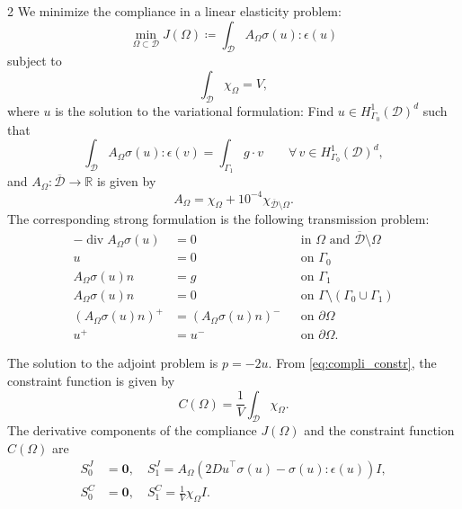\documentclass[a4paper, oneside]{article}
\begin{document}
\begin{multicols}{2}
We minimize the compliance in a linear elasticity problem:
\begin{equation} \label{eq:compli_cost}
	\min_{\Omega \subset \mathcal{D}}
	J(\Omega) \coloneqq \int_{\mathcal{D}} A_{\Omega}\sigma(u):\epsilon(u)
\end{equation}
subject to
\begin{equation}\label{eq:compli_constr}
	\int_{\mathcal{D}} \chi_{\Omega} = V,
\end{equation}
where $u$ is the solution to the variational formulation:
Find $u \in  H^1_{\Gamma_0}(\mathcal{D})^d$ such that
\begin{equation}\label{eq:compli_weak}
\int_{\mathcal{D}} A_{\Omega}\sigma(u):\epsilon(v) = \int_{\Gamma_1} g \cdot v
\qquad
\forall \, v \in  H^1_{\Gamma_0}(\mathcal{D})^d,
\end{equation}
and $A_{\Omega}:\overline{\mathcal{D}} \rightarrow \mathds{R}$ is given by
\begin{equation}\label{eq:compli_AOmega}
	A_{\Omega} = \chi_{\Omega} + {10}^{-4}\chi_{\overline{\mathcal{D}}\setminus\Omega}.
\end{equation}
The corresponding strong formulation is the following transmission problem:
\begin{equation}\label{eq:compli_prob}
	\begin{aligned}
	   -\operatorname{div} A_{\Omega} \sigma(u) &= 0 && \text{in } \Omega \text{ and }\overline{\mathcal{D}}\setminus\Omega\\
											 u  &= 0 && \text{on } \Gamma_{0}\\
					     A_{\Omega} \sigma(u)n  &= g && \text{on } \Gamma_{1} \\
					     A_{\Omega} \sigma(u)n  &= 0 && \text{on } \Gamma \setminus (\Gamma_{0} \cup \Gamma_{1})	\\
				      (A_{\Omega} \sigma(u)n)^+ &= (A_{\Omega} \sigma(u)n)^- && \text{on }  \partial\Omega\\      
						                    u^+ &= u^- && \text{on } \partial\Omega   	.				 
	\end{aligned}
\end{equation}

The solution to the adjoint problem is $p=-2u$.
From \eqref{eq:compli_constr}, the constraint function is given by
\begin{equation*}
	C(\Omega) = \frac{1}{V} \int_{\mathcal{D}} \chi_{\Omega}.
\end{equation*} 
The derivative components of the compliance $J(\Omega)$ and the constraint function $C(\Omega)$ are
\begin{align*}
	S^J_0 &= \boldsymbol{0} ,\quad S^J_1 = A_{\Omega} (2{Du}^{\top}\sigma(u)- \sigma(u):\epsilon(u))I,\\
	S^C_0 &= \boldsymbol{0},\quad S^C_1 = \frac{1}{V} \chi_\Omega I.
\end{align*}


\end{multicols}
\end{document}
